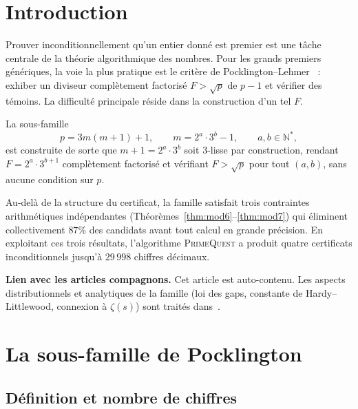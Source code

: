 \documentclass[11pt,a4paper]{article}
\theoremstyle{definition}
\theoremstyle{remark}
\newcommand{\N}{\mathbb{N}}
\begin{document}
\tableofcontents

\section{Introduction}\label{sec:intro}

Prouver inconditionnellement qu'un entier donné est premier est une tâche
centrale de la théorie algorithmique des nombres. Pour les grands premiers
génériques, la voie la plus pratique est le critère de
Pocklington--Lehmer~\cite{Pocklington1914,LehmerPSW1975} : exhiber un
diviseur complètement factorisé $F>\sqrt{p}$ de $p-1$ et vérifier des
témoins. La difficulté principale réside dans la construction d'un tel $F$.

La sous-famille
\[
  p = 3m(m+1)+1,\qquad m = 2^a\cdot 3^b-1,\qquad a,b\in\N^*,
\]
est construite de sorte que $m+1=2^a\cdot 3^b$ soit $3$-lisse par
construction, rendant $F=2^a\cdot 3^{b+1}$ complètement factorisé et
vérifiant $F>\sqrt{p}$ pour tout $(a,b)$, sans aucune condition sur $p$.

Au-delà de la structure du certificat, la famille satisfait trois
contraintes arithmétiques indépendantes
(Théorèmes~\ref{thm:mod6}--\ref{thm:mod7}) qui éliminent collectivement
$87\%$ des candidats avant tout calcul en grande précision. En exploitant
ces trois résultats, l'algorithme \textsc{PrimeQuest} a produit quatre
certificats inconditionnels jusqu'à $29\,998$ chiffres décimaux.

\smallskip
\noindent\textbf{Lien avec les articles compagnons.}
Cet article est auto-contenu. Les aspects distributionnels et analytiques
de la famille (loi des gaps, constante de Hardy--Littlewood, connexion à
$\zeta(s)$) sont traités dans~\cite{PaperI,PaperII}.

\section{La sous-famille de Pocklington}\label{sec:famille}

\subsection{Définition et nombre de chiffres}
\end{document}
